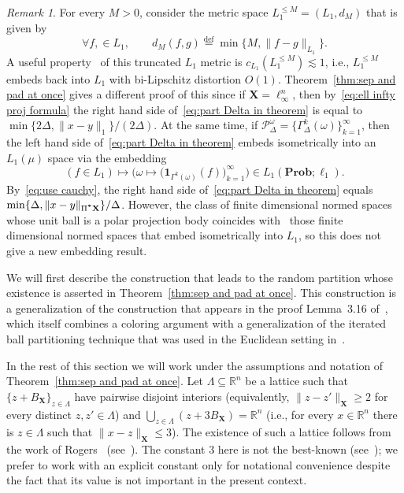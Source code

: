 \documentclass[11pt,reqno]{amsart}
\renewcommand{\le}{\leqslant}
\renewcommand{\ge}{\geqslant}
\newcommand{\X}{\mathbf X}
\newcommand{\R}{\mathbb R}
\theoremstyle{remark}
\newtheorem{remark}[theorem]{Remark}
\renewcommand{\subset}{\subseteq}
\newcommand{\eqdef}{\stackrel{\mathrm{def}}{=}}
\renewcommand{\Pr}{\mathbf{Prob}}
\renewcommand{\1}{\mathbf 1}
\newcommand{\Part}{\mathscr{P}}
\begin{document}
\begin{remark} For every $M>0$, consider the metric space $L_1^{\le M}=(L_1,d_M)$ that is given by
$$
\forall f,\in L_1,\qquad d_M(f,g)\eqdef \min\big\{M,\|f-g\|_{L_1}\big\}.
$$
A useful property~\cite[Lemma~5.4]{MN15} of this truncated $L_1$ metric is $c_{L_1}(L_1^{\le M})\lesssim 1$, i.e., $L_1^{\le M}$  embeds back into $L_1$ with bi-Lipschitz distortion $O(1)$. Theorem~\ref{thm:sep and pad at once}  gives a different proof of this since if $\X=\ell_\infty^n$, then by~\eqref{eq:ell infty proj formula} the right hand side  of~\eqref{eq:part Delta in theorem} is equal to $\min\{2\Delta,\|x-y\|_1\}/(2\Delta)$. At the same time, if $\Part_{\Delta}^\omega=\{\Gamma_\Delta^k(\omega)\}_{k=1}^\infty$, then the  left hand side of~\eqref{eq:part Delta in theorem} embeds isometrically into an $L_1(\mu)$ space via the embedding
$$
(f\in L_1)\mapsto\Big(\omega\mapsto \big(\1_{\Gamma^k(\omega)}(f)\big)_{k=1}^\infty\Big)\in L_1(\Pr;\ell_1).
$$
By~\eqref{eq:use cauchy}, the right hand side of~\eqref{eq:part Delta in theorem} equals  $\min\{\Delta, \|x-y\|_{\Pi^{\textbf *}\X}\}/\Delta$. However, the class of finite dimensional normed spaces whose unit ball is a polar projection body coincides with~\cite{Bol69} those finite dimensional normed spaces that embed isometrically into $L_1$, so this does not give a new embedding result.
\end{remark}


We will first describe the construction that leads to the random partition whose existence is asserted in Theorem~\ref{thm:sep and pad at once}. This construction is a generalization of the construction that appears in the proof Lemma~3.16 of~\cite{LN05}, which itself combines a coloring argument with a generalization of the iterated ball partitioning technique that was used in the Euclidean setting in~\cite{CCGGP98,KMS98}.



In the rest of this section we will work under the assumptions and notation of Theorem~\ref{thm:sep and pad at once}. Let $\Lambda\subset \R^n$ be a lattice such that $\{z+B_{\X}\}_{z\in \Lambda}$ have pairwise disjoint interiors (equivalently, $\|z-z'\|_{\X}\ge 2$ for every distinct $z,z'\in \Lambda$) and $\bigcup_{z\in \Lambda} (z+3B_{\X})=\R^n$ (i.e., for every $x\in \R^n$ there is $z\in \Lambda$ such that $\|x-z\|_{\X}\le 3$). The existence of such a lattice follows from the work of Rogers~\cite{Rog50} (see~\cite[Remark~6]{Zon02}). The constant $3$ here is not the best-known (see~\cite{But72,Zon02}); we prefer to work with an explicit constant only for notational convenience despite the fact that its value is not important  in the present context.
\end{document}
